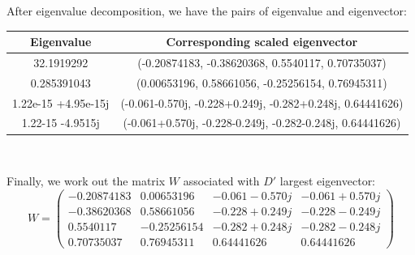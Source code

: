 \documentclass[11pt,a4paper]{article}
\newcommand{\htab}{\hspace*{0.63cm}}
\begin{document}
\htab After eigenvalue decomposition, we have the pairs of eigenvalue and eigenvector: \\
    \begin{center}
    \begin{tabular} {||c | c||} \hline
        Eigenvalue   & Corresponding scaled eigenvector \\ \hline
        32.1919292 &  (-0.20874183, -0.38620368,  0.5540117, 0.70735037)  \\  \hline
        0.285391043 & (0.00653196,  0.58661056, -0.25256154,  0.76945311)  \\ \hline
        1.22e-15 +4.95e-15j & (-0.061-0.570j, -0.228+0.249j, -0.282+0.248j, 0.64441626) \\ \hline
        1.22-15 -4.9515j & (-0.061+0.570j, -0.228-0.249j, -0.282-0.248j, 0.64441626) \\ \hline
    \end{tabular} \\
    \end{center}
\htab Finally, we work out the matrix $W$ associated with $D'$ largest eigenvector: \\
$$ W = \begin{pmatrix}
        -0.20874183 & 0.00653196 & -0.061-0.570j & -0.061+0.570j \\
        -0.38620368 & 0.58661056 & -0.228+0.249j & -0.228-0.249j \\
        0.5540117 & -0.25256154 & -0.282+0.248j & -0.282-0.248j \\
        0.70735037 &  0.76945311 & 0.64441626 & 0.64441626 
   \end{pmatrix} $$
\newpage
\end{document}
